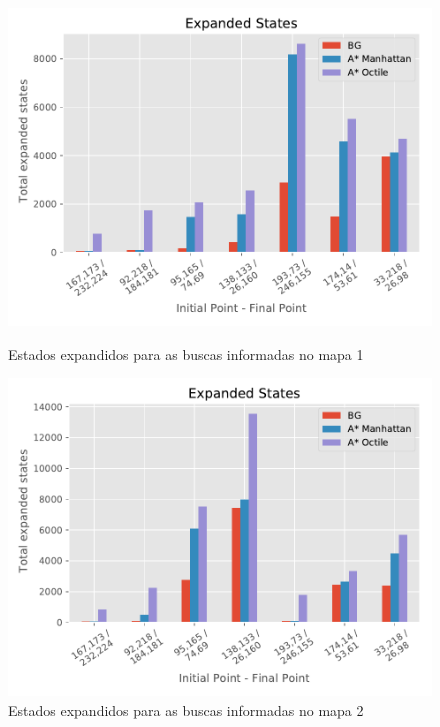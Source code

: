 \begin{figure}[!htb]
\begin{minipage}{0.5\linewidth}
\centering
\includegraphics[width=\textwidth]{Images/Expanded_States_map1_log_heuristic.pdf}
\caption{Estados expandidos para as buscas informadas no mapa 1}
\label{fig:expanded-a1}
\end{minipage}%
\begin{minipage}{0.5\linewidth}
\centering
\includegraphics[width=\textwidth]{Images/Expanded_States_map2_log_heuristic.pdf}
\caption{Estados expandidos para as buscas informadas no mapa 2}
\label{fig:expanded-a2}
\end{minipage}
\begin{minipage}{0.5\linewidth}

\end{minipage}
\end{figure}
